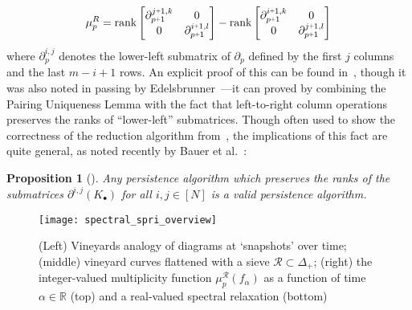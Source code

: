 \documentclass[10pt twocolumn]{article}
\numberwithin{equation}{section}
\newcommand{\+}{%
	\raisebox{0.18ex}{\scaleobj{0.55}{+}}
}
\newtheorem{proposition}{Proposition}
\theoremstyle{definition}
\theoremstyle{definition}
\begin{document}
\begin{multicols}{2}
	\begin{equation*}
	\mu_p^{R} = 
	\mathrm{rank}\begin{bmatrix} \partial_{p\+1}^{j \+ 1, k} & 0 \\
	0 & \partial_{p\+1}^{i \+ 1, l}
	\end{bmatrix}
	- 
	\mathrm{rank}\begin{bmatrix} \partial_{p\+1}^{i \+ 1, k} & 0 \\
	0 & \partial_{p\+1}^{j \+ 1, l}
	\end{bmatrix}
	\end{equation*}
\noindent 
where $\partial_p^{i, j}$ denotes the lower-left submatrix of $\partial_p$ defined by the first $j$ columns and the last $m - i + 1$ rows.
An explicit proof of this can be found in~\cite{dey2022computational}, though it was also noted in passing by Edelsbrunner~\cite{edelsbrunner2000topological}---it can proved by combining the Pairing Uniqueness Lemma with the fact that left-to-right column operations preserves the ranks of ``lower-left'' submatrices.
Though often used to show the correctness of the reduction algorithm from~\cite{edelsbrunner2000topological}, the implications of this fact are quite general, as noted recently by Bauer et al.~\cite{bauer2022keeping}:
\begin{proposition}[\cite{bauer2022keeping}]\label{prop:bauer}
	Any persistence algorithm which preserves the ranks of the submatrices $\partial^{i,j}(K_\bullet)$ for all $i,j \in [N]$ is a valid persistence algorithm. 
\end{proposition}
\end{multicols}
\begin{figure}[t!]\label{fig:overview}
\centering
\texttt{[image: spectral\_spri\_overview]}	
\caption{ (Left) Vineyards analogy of diagrams at `snapshots' over time; 
(middle) vineyard curves flattened with a sieve $\mathcal{R} \subset \Delta_+$; 
(right) the integer-valued multiplicity function $\mu_p^{\mathcal{R}}(f_\alpha)$ 
as a function of time $\alpha \in \mathbb{R}$ (top) and a real-valued spectral relaxation (bottom)
}
\end{figure}
\end{document}
